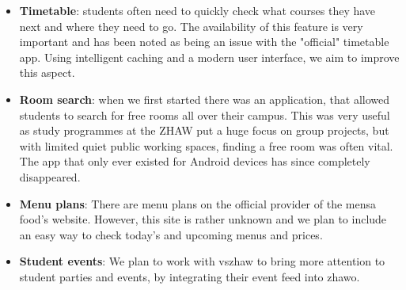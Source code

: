 \begin{markdown}
\begin{itemize}
  \item \textbf{Timetable}: students often need to quickly check what courses they have next and where they need to go. The availability of this feature is very important and has been noted as being an issue with the "official" timetable app. Using intelligent caching and a modern user interface, we aim to improve this aspect.
  \item \textbf{Room search}: when we first started there was an application, that allowed students to search for free rooms all over their campus. This was very useful as study programmes at the ZHAW put a huge focus on group projects, but with limited quiet public working spaces, finding a free room was often vital. The app that only ever existed for Android devices has since completely disappeared.
  \item \textbf{Menu plans}: There are menu plans on the official provider of the mensa food's website. However, this site is rather unknown and we plan to include an easy way to check today's and upcoming menus and prices.
  \item \textbf{Student events}: We plan to work with vszhaw to bring more attention to student parties and events, by integrating their event feed into zhawo.
\end{itemize}

\end{markdown}
